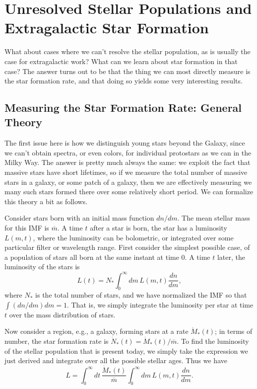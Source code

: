 \section{Unresolved Stellar Populations and Extragalactic Star Formation}

What about cases where we can't resolve the stellar population, as is usually the case for extragalactic work? What can we learn about star formation in that case? The answer turns out to be that the thing we can most directly measure is the star formation rate, and that doing so yields some very interesting results.

\subsection{Measuring the Star Formation Rate: General Theory}

The first issue here is how we distinguish young stars beyond the Galaxy, since we can't obtain spectra, or even colors, for individual protostars as we can in the Milky Way. The answer is pretty much always the same: we exploit the fact that massive stars have short lifetimes, so if we measure the total number of massive stars in a galaxy, or some patch of a galaxy, then we are effectively measuring we many such stars formed there over some relatively short period. We can formalize this theory a bit as follows.

Consider stars born with an initial mass function $dn/dm$. The mean stellar mass for this IMF is $\overline{m}$. A time $t$ after a star is born, the star has a luminosity $L(m,t)$, where the luminosity can be bolometric, or integrated over some particular filter or wavelength range. First consider the simplest possible case, of a population of stars all born at the same instant at time $0$. A time $t$ later, the luminosity of the stars is
\begin{equation}
L(t) = N_* \int_0^{\infty} dm\, L(m,t) \frac{dn}{dm},
\end{equation}
where $N_*$ is the total number of stars, and we have normalized the IMF so that $\int (dn/dm) dm = 1$. That is, we simply integrate the luminosity per star at time $t$ over the mass distribution of stars.

Now consider a region, e.g., a galaxy, forming stars at a rate $\dot{M}_*(t)$; in terms of number, the star formation rate is $\dot{N}_*(t) = \dot{M}_*(t)/\overline{m}$. To find the luminosity of the stellar population that is present today, we simply take the expression we just derived and integrate over all the possible stellar ages. Thus we have
\begin{equation}
L =  \int_{0}^\infty dt \, \frac{\dot{M}_*(t)}{\overline{m}}  \int_0^{\infty} dm \, L(m,t) \frac{dn}{dm}.
\end{equation}

